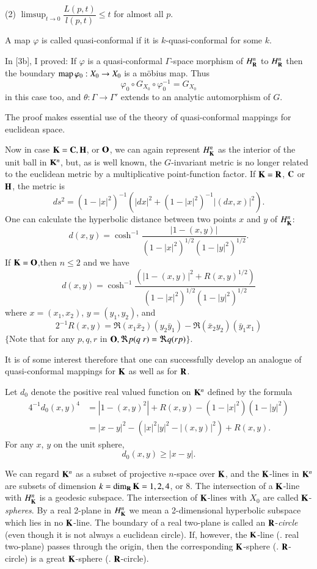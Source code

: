 (2) ${\displaystyle{\mathop{\lim\sup}_{t \to 0}}} \dfrac{L (p,t)}{l(p,t)} \leqslant t$ \quad for almost all $p$.

A map $\varphi$ is called quasi-conformal if it is $k$-quasi-conformal for some $k$.

In [3b], I proved: If $\varphi$ is a quasi-conformal $\Gamma$-space morphism of $H^n_{\mathbf{R}}$ to $H^n_{\mathbf{R}}$ then the boundary $\operatorname{map} \varphi_0: X_0 \to X_0$ is a m\"obius  map. Thus 
$$
\varphi_0 \circ G_{X_0} \circ \varphi_0^{-1}  = G_{X_0}
$$
in this case too, and $\theta : \Gamma \to \Gamma'$ extends to an analytic automorphism of $G$.

The proof makes essential use of the theory of quasi-conformal mappings for euclidean space.

Now in case $\mathbf{K} = \mathbf{C}, \mathbf{H}$, or $\mathbf{O}$, we can again represent $H^n_{\mathbf{K}}$ as the interior of the unit ball in $\mathbf{K}^n$, but, as is well known, the $G$-invariant metric is no longer related to the euclidean metric by a multiplicative point-function factor. If $\mathbf{K} = \mathbf{R}$, $\mathbf{C}$ or $\mathbf{H}$, the metric is
$$
ds^2 = (1 - |x|^2)^{-1} (|dx|^2 + (1-|x|^2)^{-1} | (dx, x)|^2).
$$
One can calculate the hyperbolic distance between two points $x$ and $y$ of $H^n_{\mathbf{K}}$:
$$
d(x,y) = \cosh^{-1} \frac{|1 - (x,y)|}{(1 - |x|^2)^{1/2} (1 - |y|^2)^{1/2}}.
$$
If $\mathbf{K} = \mathbf{O}$,\pageoriginale then $n \leqslant 2$ and we have
$$
d(x,y) = \cosh^{-1} \frac{(|1-(x,y)|^2 + R (x, y)^{1/2})}{(1-|x|^2)^{1/2} (1-|y|^2)^{1/2}}
$$
where $x = (x_1, x_2)$, $y = (y_1, y_2)$, and
$$
2^{-1} R(x,y)  = \Re (x_1 \bar{x}_2) (y_2 \bar{y}_1) - \Re (\bar{x}_2 y_2) (\bar{y}_1 x_1)
$$
$\{$Note that for any $p, q, r$ in $\mathbf{O}, \Re p (q \; r) = \Re q(r p)$$\}$.

It is of some interest therefore that one can successfully develop an analogue of quasi-conformal mappings for $\mathbf{K}$ as well as for $\mathbf{R}$.

Let $d_0$ denote the positive real valued function on $\mathbf{K}^n$ defined by the formula
\begin{align*}
4^{-1} d_0 (x,y)^4 & = |1 - (x,y)^2| + R (x,y) - (1-|x|^2)(1-|y|^2)\\
& = |x-y|^2 - (|x|^2 |y|^2 - |(x,y)|^2)  + R (x,y).
\end{align*}
For any $x$, $y$ on the unit sphere, 
$$
d_0 (x,y) \geqslant |x-y|.
$$

We can regard $\mathbf{K}^n$ as a subset of projective $n$-space over $\mathbf{K}$, and the $\mathbf{K}$-lines in $\mathbf{K}^n$ are subsets of dimension $k = \dim_{\mathbf{R}} \mathbf{K} = 1, 2, 4$, or 8. The intersection of a $\mathbf{K}$-line with $H^n_{\mathbf{K}}$ is a geodesic subspace. The intersection of $\mathbf{K}$-lines with $X_0$ are called $\mathbf{K}$-\textit{spheres}. By a real 2-plane in $H^n_{\mathbf{K}}$ we mean a 2-dimensional hyperbolic subspace which lies in no $\mathbf{K}$-line. The boundary of a real two-plane is called an $\mathbf{R}$-\textit{circle} (even though it is not always a euclidean circle). If, however, the $\mathbf{K}$-line (\resp. real two-plane) passes through the origin, then the corresponding $\mathbf{K}$-sphere (\resp. $\mathbf{R}$-circle) is a great $\mathbf{K}$-sphere (\resp. $\mathbf{R}$-circle).

